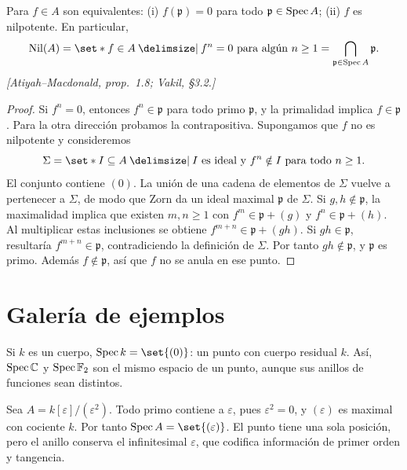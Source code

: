 \begin{teo}
\label{teo:s01-caracterizacion-nilradical}
Para $f\in A$ son equivalentes: (i) $f(\mathfrak p)=0$ para todo $\mathfrak p\in\operatorname{Spec} A$; (ii) $f$ es nilpotente. En particular,
\[
\Nil(A)=\set*{f\in A \given f^n=0\text{ para algún }n\ge1}=\bigcap_{\mathfrak p\in\Spec A}\mathfrak p.
\]
\emph{[Atiyah--Macdonald, prop.~1.8; Vakil, \S3.2.]}
\end{teo}
\begin{proof}
Si $f^n=0$, entonces $f^n\in\mathfrak p$ para todo primo $\mathfrak p$, y la primalidad implica $f\in\mathfrak p$. Para la otra dirección probamos la contrapositiva. Supongamos que $f$ no es nilpotente y consideremos
\[
\Sigma=\set*{I\subseteq A \given I\text{ es ideal y }f^n\notin I\text{ para todo }n\ge1}.
\]
El conjunto contiene $(0)$. La unión de una cadena de elementos de $\Sigma$ vuelve a pertenecer a $\Sigma$, de modo que Zorn da un ideal maximal $\mathfrak p$ de $\Sigma$. Si $g,h\notin\mathfrak p$, la maximalidad implica que existen $m,n\ge1$ con $f^m\in\mathfrak p+(g)$ y $f^n\in\mathfrak p+(h)$. Al multiplicar estas inclusiones se obtiene $f^{m+n}\in\mathfrak p+(gh)$. Si $gh\in\mathfrak p$, resultaría $f^{m+n}\in\mathfrak p$, contradiciendo la definición de $\Sigma$. Por tanto $gh\notin\mathfrak p$, y $\mathfrak p$ es primo. Además $f\notin\mathfrak p$, así que $f$ no se anula en ese punto.
\end{proof}

\section{Galería de ejemplos}

\begin{ejem}[Cuerpos]
\label{ejem:s01-cuerpos}
Si $k$ es un cuerpo, $\Spec k=\set{(0)}$: un punto con cuerpo residual $k$. Así, $\operatorname{Spec}\mathbb C$ y $\operatorname{Spec}\mathbb F_2$ son el mismo espacio de un punto, aunque sus anillos de funciones sean distintos.
\end{ejem}

\begin{ejem}
\label{ejem:s01-punto-gordo}
Sea $A=k[\varepsilon]/(\varepsilon^2)$. Todo primo contiene a $\varepsilon$, pues $\varepsilon^2=0$, y $(\varepsilon)$ es maximal con cociente $k$. Por tanto $\Spec A=\set{(\varepsilon)}$. El punto tiene una sola posición, pero el anillo conserva el infinitesimal $\varepsilon$, que codifica información de primer orden y tangencia.
\end{ejem}

